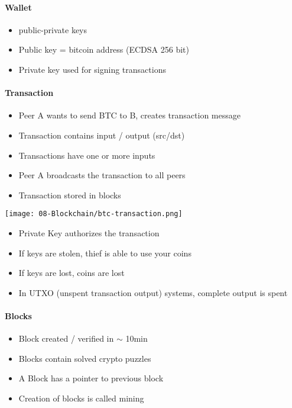 \paragraph{Wallet}
\begin{itemize}
    \item public-private keys
    \item Public key = bitcoin address (ECDSA 256 bit)
    \item Private key used for signing transactions
\end{itemize}
\paragraph{Transaction}
\begin{itemize}
    \item Peer A wants to send BTC to B, creates transaction message
    \item Transaction contains input / output (src/dst)
    \item Transactions have one or more inputs
    \item Peer A broadcasts the transaction to all peers
    \item Transaction stored in blocks
\end{itemize}
\begin{center}
    \texttt{[image: 08-Blockchain/btc-transaction.png]}
\end{center}
\vspace{-8pt}
\begin{itemize}
    \item Private Key authorizes the transaction
    \item If keys are stolen, thief is able to use your coins
    \item If keys are lost, coins are lost
    \item In UTXO (unspent transaction output) systems, complete output is spent
\end{itemize}

\paragraph{Blocks}
\begin{itemize}
    \item Block created / verified in $\sim$ 10min
    \item Blocks contain solved crypto puzzles
    \item A Block has a pointer to previous block
    \item Creation of blocks is called mining
\end{itemize}

